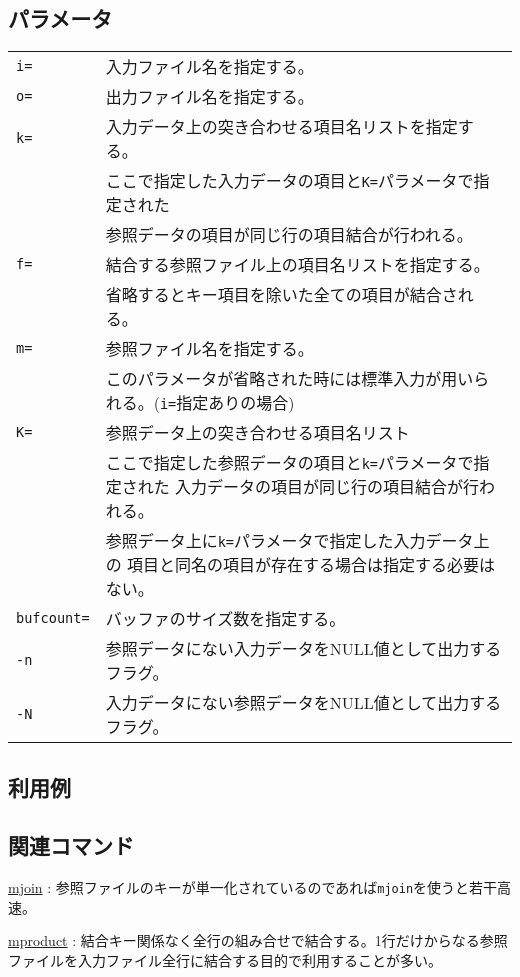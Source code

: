 \subsection*{パラメータ}
\begin{table}[htbp]
{\small
\begin{tabular}{ll}
\verb|i=|    & 入力ファイル名を指定する。\\
\verb|o=|    & 出力ファイル名を指定する。\\
\verb|k=|    & 入力データ上の突き合わせる項目名リストを指定する。\\
             & ここで指定した入力データの項目と\verb|K=|パラメータで指定された \\
             & 参照データの項目が同じ行の項目結合が行われる。\\
\verb|f=|    & 結合する参照ファイル上の項目名リストを指定する。\\
             & 省略するとキー項目を除いた全ての項目が結合される。\\
\verb|m=|    & 参照ファイル名を指定する。\\
             & このパラメータが省略された時には標準入力が用いられる。(\verb|i=|指定ありの場合)\\
\verb|K=|    & 参照データ上の突き合わせる項目名リスト\\
             & ここで指定した参照データの項目と\verb|k=|パラメータで指定された
               入力データの項目が同じ行の項目結合が行われる。\\
             & 参照データ上に\verb|k=|パラメータで指定した入力データ上の
               項目と同名の項目が存在する場合は指定する必要はない。\\
\verb|bufcount=| & バッファのサイズ数を指定する。 \\
\verb|-n|    & 参照データにない入力データをNULL値として出力するフラグ。\\
\verb|-N|    & 入力データにない参照データをNULL値として出力するフラグ。\\
\end{tabular} 
}
\end{table} 

\subsection*{利用例}

\subsection*{関連コマンド}
\hyperref[sect:mjoin] {mjoin} : 参照ファイルのキーが単一化されているのであれば\verb|mjoin|を使うと若干高速。

\hyperref[sect:mproduct] {mproduct} : 結合キー関係なく全行の組み合せで結合する。1行だけからなる参照ファイルを入力ファイル全行に結合する目的で利用することが多い。

%
